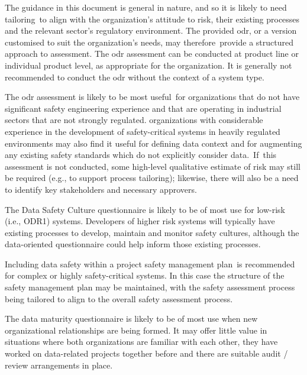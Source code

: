 The guidance in this document is general in nature, and so it is \cbstart likely to need \gls{tailoring}\cbend\ to align with the organization's attitude to risk, their existing processes and the relevant sector's regulatory environment. \cbstart The provided \gls{odr}, or a version customised to suit the organization's needs, may therefore\cbend\ provide a structured approach to assessment.
The \gls{odr} assessment can be conducted at product line or individual product level, as appropriate for the organization. It is generally not recommended to conduct the \gls{odr} without the context of a system type.

\cbstart The \gls{odr} assessment is likely to be most useful\cbend\ for organizations that do not have significant safety engineering experience and that are operating in \cbstart industrial sectors that are not strongly regulated\cbend.
organizations with considerable experience in the development of safety-critical systems in heavily regulated environments
may also find it \cbstart useful for defining data context and for augmenting any existing safety standards which do not explicitly consider data.\cbend\
\cbstart If\cbend\ this assessment is not conducted, some high-level qualitative estimate of risk may still be required (e.g., to support process \gls{tailoring}); likewise, there will also be a need to identify key \glspl{stakeholder} and necessary approvers.

\cbstart The Data Safety Culture questionnaire is likely to be of most use for low-risk (i.e., ODR1) systems. Developers of higher risk systems will typically have existing processes to develop, maintain and monitor safety cultures, although the data-oriented questionnaire could help inform those existing processes\cbend.

\cbstart Including data safety within a project safety management plan\cbend\ is recommended for complex or highly safety-critical systems. In this case the structure of the safety management plan may be maintained, with the \gls{safety assessment} process being tailored to align to the overall safety assessment process.

The \cbstart data maturity questionnaire is likely to be of most use when new organizational relationships are being formed. It may offer little value in situations where both organizations are familiar with each other, they have worked on data-related projects together before and there are suitable audit / review arrangements in place\cbend.

